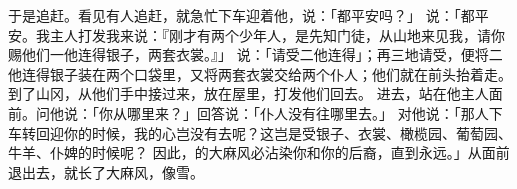 {于是{}追赶{}。{}看见有人追赶，就急忙下车迎着他，说：「都平安吗？」
说：「都平安。我主人打发我来说：『刚才有两个少年人，是先知门徒，从{}山地来见我，请你赐他们一他连得银子，两套衣裳。』」
说：「请受二他连得」；再三地请受，便将二他连得银子装在两个口袋里，又将两套衣裳交给两个仆人；他们就在{}前头抬着走。
到了山冈，{}从他们手中接过来，放在屋里，打发他们回去。
进去，站在他主人面前。{}问他说：「{}你从哪里来？」回答说：「仆人没有往哪里去。」
对他说：「那人下车转回迎你的时候，我的心岂没有去呢？这岂是受银子、衣裳、{}橄榄园、葡萄园、牛羊、仆婢的时候呢？
因此，{}的大麻风必沾染你和你的后裔，直到永远。」{}从{}面前退出去，就长了大麻风，像雪{}。

}
